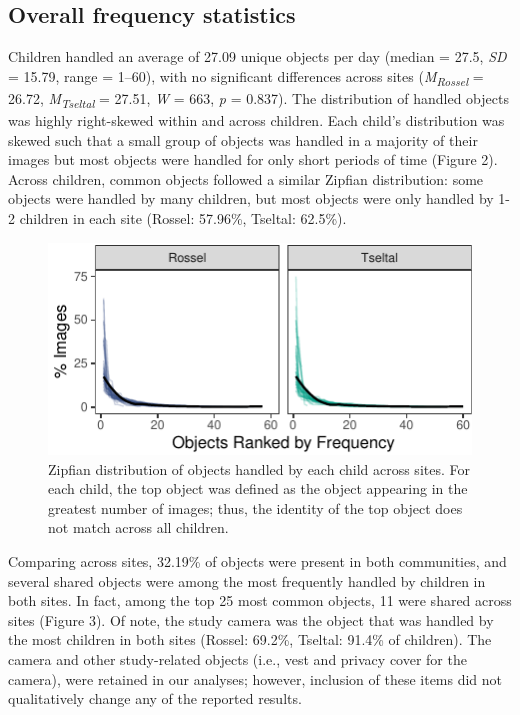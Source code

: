 \documentclass[10pt, letterpaper]{article}
\newenvironment{CodeChunk}{}{}
\begin{document}
\hypertarget{overall-frequency-statistics}{%
\subsection{Overall frequency
statistics}\label{overall-frequency-statistics}}

Children handled an average of 27.09 unique objects per day (median =
27.5, \emph{SD} = 15.79, range = 1--60), with no significant differences
across sites (\emph{M}\textsubscript{\emph{Rossel}} = 26.72,
\emph{M}\textsubscript{\emph{Tseltal}} = 27.51, \emph{W} = 663, \emph{p}
= 0.837). The distribution of handled objects was highly right-skewed
within and across children. Each child's distribution was skewed such
that a small group of objects was handled in a majority of their images
but most objects were handled for only short periods of time (Figure 2).
Across children, common objects followed a similar Zipfian distribution:
some objects were handled by many children, but most objects were only
handled by 1-2 children in each site (Rossel: 57.96\%, Tseltal: 62.5\%).

\begin{CodeChunk}
\begin{figure}[h]

{\centering \includegraphics{figs/zipfian-objects-fig-1} 

}

\caption[Zipfian distribution of objects handled by each child across sites]{Zipfian distribution of objects handled by each child across sites. For each child, the top object was defined as the object appearing in the greatest number of images; thus, the identity of the top object does not match across all children.}\label{fig:zipfian-objects-fig}
\end{figure}
\end{CodeChunk}

Comparing across sites, 32.19\% of objects were present in both
communities, and several shared objects were among the most frequently
handled by children in both sites. In fact, among the top 25 most common
objects, 11 were shared across sites (Figure 3). Of note, the study
camera was the object that was handled by the most children in both
sites (Rossel: 69.2\%, Tseltal: 91.4\% of children). The camera and
other study-related objects (i.e., vest and privacy cover for the
camera), were retained in our analyses; however, inclusion of these
items did not qualitatively change any of the reported results.
\end{document}
